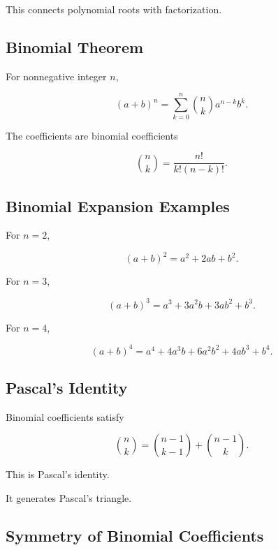 This connects polynomial roots with factorization.

\subsection{Binomial Theorem}
\label{subsec:binomial-theorem-reference}

For nonnegative integer \(n\),

\[
\boxed{
(a+b)^n
=
\sum_{k=0}^{n}
\binom{n}{k}
a^{n-k}b^k.
}
\]

The coefficients are binomial coefficients

\[
\boxed{
\binom{n}{k}
=
\frac{n!}{k!(n-k)!}.
}
\]

\subsection{Binomial Expansion Examples}
\label{subsec:binomial-expansion-examples}

For \(n=2\),

\[
\boxed{
(a+b)^2
=
a^2+2ab+b^2.
}
\]

For \(n=3\),

\[
\boxed{
(a+b)^3
=
a^3+3a^2b+3ab^2+b^3.
}
\]

For \(n=4\),

\[
\boxed{
(a+b)^4
=
a^4+4a^3b+6a^2b^2+4ab^3+b^4.
}
\]

\subsection{Pascal's Identity}
\label{subsec:pascals-identity-reference}

Binomial coefficients satisfy

\[
\boxed{
\binom{n}{k}
=
\binom{n-1}{k-1}
+
\binom{n-1}{k}.
}
\]

This is Pascal's identity.

It generates Pascal's triangle.

\subsection{Symmetry of Binomial Coefficients}
\label{subsec:binomial-symmetry}

